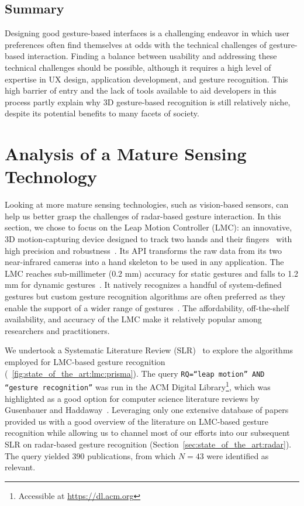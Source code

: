 \subsection{Summary} \label{sec:state_of_the_art:overview:summary}
Designing good gesture-based interfaces is a challenging endeavor in which user preferences often find themselves at odds with the technical challenges of gesture-based interaction. Finding a balance between usability and addressing these technical challenges should be possible, although it requires a high level of expertise in UX design, application development, and gesture recognition. This high barrier of entry and the lack of tools available to aid developers in this process partly explain why 3D gesture-based recognition is still relatively niche, despite its potential benefits to many facets of society.


\section{Analysis of a Mature Sensing Technology} \label{sec:state_of_the_art:lmc}
Looking at more mature sensing technologies, such as vision-based sensors, can help us better grasp the challenges of radar-based gesture interaction.
%
In this section, we chose to focus on the Leap Motion Controller (LMC): an innovative, 3D motion-capturing device designed to track two hands and their fingers~\cite{Togootogtokh:2018} with high precision and robustness~\cite{Weichert:2013}. Its API transforms the raw data from its two near-infrared cameras into a hand skeleton to be used in any application. The LMC reaches sub-millimeter (0.2 mm) accuracy for static gestures and falls to 1.2 mm for dynamic gestures~\cite{Weichert:2013}. It natively recognizes a handful of system-defined gestures but custom gesture recognition algorithms are often preferred as they enable the support of a wider range of gestures~\cite{Brandon:2014}.
The affordability, off-the-shelf availability, and accuracy of the LMC make it relatively popular among researchers and practitioners.

We undertook a Systematic Literature Review (SLR)~\cite{Kitchenham:2010} to explore the algorithms employed for LMC-based gesture recognition (\fig~\ref{fig:state_of_the_art:lmc:prisma}). 
%
The query \texttt{RQ=``leap motion'' AND ``gesture recognition''} was run in the ACM Digital Library\footnote{Accessible at \url{https://dl.acm.org}}, which was highlighted as a good option for computer science literature reviews by Gusenbauer and Haddaway~\cite{Gusenbauer:2020}. Leveraging only one extensive database of papers provided us with a good overview of the literature on LMC-based gesture recognition while allowing us to channel most of our efforts into our subsequent SLR on radar-based gesture recognition (Section~\ref{sec:state_of_the_art:radar}).
%
The query yielded 390 publications, from which $N{=}43$ were identified as relevant. 

